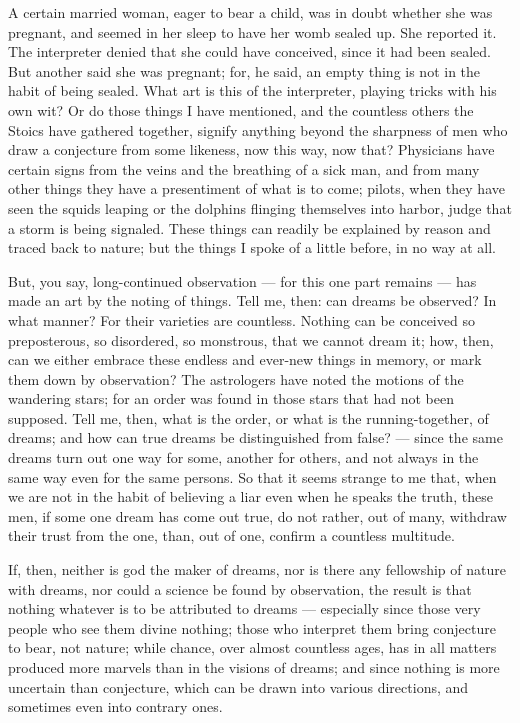  A certain married woman, eager to bear a child, was in doubt whether she was pregnant, and seemed in her sleep to have her womb sealed up. She reported it. The interpreter denied that she could have conceived, since it had been sealed. But another said she was pregnant; for, he said, an empty thing is not in the habit of being sealed. What art is this of the interpreter, playing tricks with his own wit? Or do those things I have mentioned, and the countless others the Stoics have gathered together, signify anything beyond the sharpness of men who draw a conjecture from some likeness, now this way, now that? Physicians have certain signs from the veins and the breathing of a sick man, and from many other things they have a presentiment of what is to come; pilots, when they have seen the squids leaping or the dolphins flinging themselves into harbor, judge that a storm is being signaled. These things can readily be explained by reason and traced back to nature; but the things I spoke of a little before, in no way at all.

 But, you say, long-continued observation — for this one part remains — has made an art by the noting of things. Tell me, then: can dreams be observed? In what manner? For their varieties are countless. Nothing can be conceived so preposterous, so disordered, so monstrous, that we cannot dream it; how, then, can we either embrace these endless and ever-new things in memory, or mark them down by observation? The astrologers have noted the motions of the wandering stars; for an order was found in those stars that had not been supposed. Tell me, then, what is the order, or what is the running-together, of dreams; and how can true dreams be distinguished from false? — since the same dreams turn out one way for some, another for others, and not always in the same way even for the same persons. So that it seems strange to me that, when we are not in the habit of believing a liar even when he speaks the truth, these men, if some one dream has come out true, do not rather, out of many, withdraw their trust from the one, than, out of one, confirm a countless multitude.

 If, then, neither is god the maker of dreams, nor is there any fellowship of nature with dreams, nor could a science be found by observation, the result is that nothing whatever is to be attributed to dreams — especially since those very people who see them divine nothing; those who interpret them bring conjecture to bear, not nature; while chance, over almost countless ages, has in all matters produced more marvels than in the visions of dreams; and since nothing is more uncertain than conjecture, which can be drawn into various directions, and sometimes even into contrary ones.

